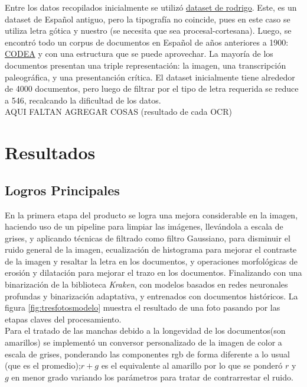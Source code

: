 \documentclass[11pt,a4paper]{article}
\begin{document}
Entre los datos recopilados inicialmente se utiliz\'o \href{https://zenodo.org/records/1490009/files/Rodrigo%20corpus%201.0.0.tar.gz?download=1}{dataset de rodrigo}. Este, es un dataset de Español antiguo, pero la tipograf\'ia no coincide, pues en este caso se utiliza letra g\'otica y nuestro (se necesita que sea procesal-cortesana). Luego, se encontr\'o todo un corpus de documentos en Español de años anteriores a 1900: \href{https://corpuscodea.es/}{CODEA} y con una estructura que se puede aprovechar. La mayor\'ia de los documentos presentan una triple representaci\'on: la imagen, una transcripción paleogr\'afica, y una presentanci\'on cr\'itica. El dataset inicialmente tiene alrededor de 4000 documentos, pero luego de filtrar por el tipo de letra requerida se reduce a 546, recalcando la dificultad de los datos.\\

AQUI FALTAN AGREGAR COSAS (resultado de cada OCR)\\

\section{Resultados} 
\subsection{Logros Principales} 

En la primera etapa del producto se logra una mejora considerable en la imagen, haciendo uso de un pipeline para limpiar las im\'agenes, llev\'andola a escala de grises, y aplicando t\'ecnicas de filtrado como filtro Gaussiano, para disminuir el ruido general de la imagen, ecualización de histograma para mejorar el contraste de la imagen y resaltar la letra en los documentos, y operaciones morfológicas de erosión y dilatación para mejorar el trazo en los documentos. Finalizando con una binarización de la biblioteca \textit{Kraken}, con modelos basados en redes neuronales profundas y binarización adaptativa, y entrenados con documentos históricos. La figura \ref{fig:tresfotosmodelo} muestra el resultado de una foto pasando por las etapas claves del procesamiento.\\

Para el tratado de las manchas debido a la longevidad de los documentos(son amarillos) se implement\'o un conversor personalizado de la imagen de color a escala de grises, ponderando las componentes rgb de forma diferente a lo usual (que es el promedio);$r + g$ es el equivalente al amarillo por lo que se ponderó $r$ y $g$ en menor grado variando los par\'ametros para tratar de contrarrestar el ruido.
\end{document}
